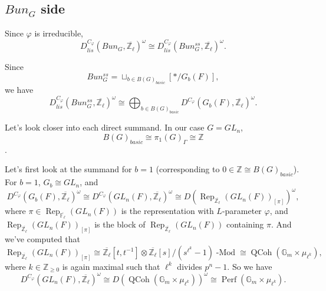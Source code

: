 \documentclass{article}
\newcommand{\Rep}{\operatorname{Rep}}
\newcommand{\Modl}{\operatorname{-Mod}}
\newcommand{\Perf}{\operatorname{Perf}}
\newcommand{\QCoh}{\operatorname{QCoh}}
\begin{document}
\subsection{$Bun_G$ side}

Since $\varphi$ is irreducible, 
$$D^{C_{\varphi}}_{lis}(Bun_G, \overline{\mathbb{Z}_{\ell}})^{\omega} \cong D^{C_{\varphi}}_{lis}(Bun_G^{ss}, \overline{\mathbb{Z}_{\ell}})^{\omega}.$$

Since
$$Bun_G^{ss}=\sqcup_{b \in B(G)_{basic}}[*/G_b(F)],$$
we have 
$$D^{C_{\varphi}}_{lis}(Bun_G^{ss}, \overline{\mathbb{Z}_{\ell}})^{\omega} \cong \bigoplus_{b \in B(G)_{basic}}D^{C_{\varphi}}(G_b(F), \overline{\mathbb{Z}_{\ell}})^{\omega}.$$

Let's look closer into each direct summand. In our case $G=GL_n$, 
$$B(G)_{basic} \cong \pi_1(G)_{\Gamma} \cong \mathbb{Z}$$. 

Let's first look at the summand for $b=1$ (corresponding to $0 \in \mathbb{Z} \cong B(G)_{basic}$). For $b=1$, $G_b \cong GL_n$, and 
$$D^{C_{\varphi}}(G_b(F), \overline{\mathbb{Z}_{\ell}})^{\omega} \cong D^{C_{\varphi}}(GL_n(F), \overline{\mathbb{Z}_{\ell}})^{\omega} \cong D(\Rep_{\overline{\mathbb{Z}_{\ell}}}(GL_n(F))_{[\pi]})^{\omega},$$
where $\pi \in \Rep_{\overline{\mathbb{F}_{\ell}}}(GL_n(F))$ is the representation with $L$-parameter $\varphi$, and $\Rep_{\overline{\mathbb{Z}_{\ell}}}(GL_n(F))_{[\pi]}$ is the block of $\Rep_{\overline{\mathbb{Z}_{\ell}}}(GL_n(F))$ containing $\pi$.
And we've computed that
$$\Rep_{\overline{\mathbb{Z}_{\ell}}}(GL_n(F))_{[\pi]} \cong \overline{\mathbb{Z}_{\ell}}[t, t^{-1}] \otimes \overline{\mathbb{Z}_{\ell}}[s]/(s^{\ell^k}-1)\Modl \cong \QCoh(\mathbb{G}_m \times \mu_{\ell^k}),$$
where $k \in \mathbb{Z}_{\geq 0}$ is again maximal such that $\ell^k$ divides $p^n-1$. So we have
$$D^{C_{\varphi}}(GL_n(F), \overline{\mathbb{Z}_{\ell}})^{\omega} \cong D(\QCoh(\mathbb{G}_m \times \mu_{\ell^k}))^{\omega} \cong \Perf(\mathbb{G}_m \times \mu_{\ell^k}).$$
\end{document}
